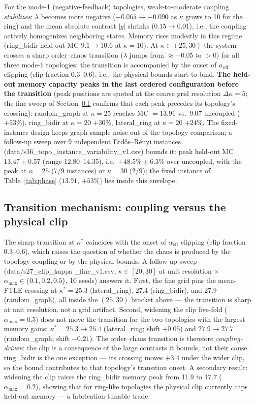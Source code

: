 \documentclass[11pt]{article}
\begin{document}
For the mode-1 (negative-feedback) topologies, weak-to-moderate coupling
\emph{stabilizes}: $\lambda$ becomes more negative ($-0.065 \to -0.090$ as
$\kappa$ grows to 10 for the ring) and the mean absolute contrast $|g|$
shrinks ($0.15 \to 0.01$), i.e., the coupling actively homogenizes neighboring
states. Memory rises modestly in this regime (ring\_bidir held-out MC
$9.1 \to 10.6$ at $\kappa=10$). At $\kappa \in (25, 30)$ the system crosses a
sharp order--chaos transition ($\lambda$ jumps from $\approx -0.05$ to $>0$)
for all three mode-1 topologies; the transition is accompanied by the onset of
$\alpha_{\mathrm{eff}}$ clipping (clip fraction 0.3--0.6), i.e., the physical
bounds start to bind. \textbf{The held-out memory capacity peaks in the last
ordered configuration before the transition} (peak positions are quoted at
the coarse grid resolution $\Delta\kappa=5$; the fine sweep of
Section~\ref{sec:clipablation} confirms that each peak precedes its
topology's crossing): random\_graph at $\kappa=25$
reaches MC $=13.91$ vs.\ $9.07$ uncoupled ($+53\%$), ring\_bidir at $\kappa=20$
$+30\%$, lateral\_ring at $\kappa=20$ $+24\%$. The fixed-instance design
keeps graph-sample noise out of the topology comparison; a follow-up
sweep over 9 independent Erd\H{o}s--R\'enyi instances
(data/s36\_topo\_instance\_variability\_v1.csv) bounds it: peak held-out
MC $13.47\pm0.57$ (range $12.80$--$14.35$), i.e.\ $+48.5\%\pm6.3\%$ over
uncoupled, with the peak at $\kappa=25$ (7/9 instances) or $\kappa=30$
(2/9); the fixed instance of Table~\ref{tab:phase} ($13.91$, $+53\%$)
lies inside this envelope.

\subsection{Transition mechanism: coupling versus the physical clip}
\label{sec:clipablation}

The sharp transition at $\kappa^\ast$ coincides with the onset of
$\alpha_{\mathrm{eff}}$ clipping (clip fraction 0.3--0.6), which raises
the question of whether the chaos is produced by the topology coupling
or by the physical bounds. A follow-up sweep (data/s27\_clip\_kappa
\_fine\_v1.csv; $\kappa\in[20,30]$ at unit resolution $\times$
$\alpha_{\max}\in\{0.1,0.2,0.5\}$, 10 seeds) answers it. First, the fine
grid pins the mean-FTLE crossing at $\kappa^\ast = 25.3$ (lateral\_ring),
27.4 (ring\_bidir), and 27.9 (random\_graph), all inside the $(25,30)$
bracket above --- the transition is sharp at unit resolution, not a grid
artifact. Second,
widening the clip five-fold ($\alpha_{\max}=0.5$) does not move the
transition for the two topologies with the largest memory gains:
$\kappa^\ast = 25.3\to25.4$ (lateral\_ring; shift $+0.05$) and
$27.9\to27.7$ (random\_graph; shift $-0.21$). The order--chaos transition
is therefore
\emph{coupling-driven}: the clip is a consequence of the large contrasts
it bounds, not their cause. ring\_bidir is the one exception --- its
crossing moves $+3.4$ under the wider clip, so the
bound contributes to that topology's transition onset. A secondary
result: widening the clip raises the ring\_bidir memory peak from 11.9
to 17.7 ($\alpha_{\max}=0.2$), showing that for ring-like topologies the
physical clip currently caps held-out memory --- a fabrication-tunable
trade.
\end{document}
